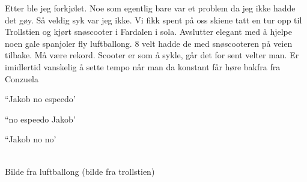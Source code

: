 Etter
ble jeg forkjølet. Noe som egentlig bare var et problem da jeg ikke
hadde det gøy. Så veldig syk var jeg ikke. Vi fikk spent på oss skiene
tatt en tur opp til Trollstien og kjørt snøscooter
i Fardalen i sola. Avslutter elegant med å  hjelpe noen gale spanjoler
fly luftballong. 8 velt hadde de med snøscooteren på veien tilbake. Må
være rekord. Scooter er som å sykle, går det for sent velter man. Er
imidlertid vanskelig å sette tempo når man da konstant får høre
bakfra fra Conzuela
\begin{dialogue}
	\item ``Jakob no espeedo'
	\item ``no espeedo Jakob'
	\item ``Jakob no no'
\end{dialogue}
\\
Bilde fra luftballong
(bilde fra trollstien)


